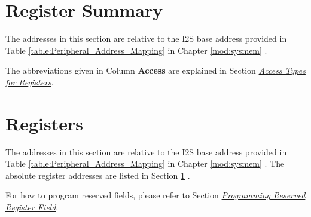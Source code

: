 \documentclass[main\_\_EN.tex]{subfiles}
\begin{document}
\hypertarget{i2s-reg-summ}{}
\section{Register Summary}\label{sec:i2s-reg-summ}

The addresses in this section are relative to the I2S base address provided in Table \ref{table:Peripheral_Address_Mapping} in Chapter \ref{mod:sysmem} \textit{}.

The abbreviations given in Column \textbf{Access} are explained in Section \hyperref[glossary-access-types]{\textit{Access Types for Registers}}.



{\clearpage}
\section{Registers}\label{I2SRegister}

The addresses in this section are relative to the I2S base address provided in Table \ref{table:Peripheral_Address_Mapping} in Chapter \ref{mod:sysmem} \textit{}. The absolute register addresses are listed in Section \ref{sec:i2s-reg-summ} \textit{}.

For how to program reserved fields, please refer to Section \hyperref[programming-reserved-field]{\textit{Programming Reserved Register Field}}.



\end{document}
